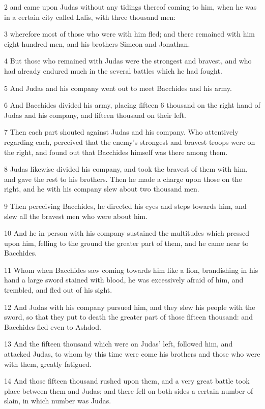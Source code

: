 2 and came upon Judas without any tidings thereof coming to him, when he was in a certain city called Lalis, with three thousand men: 

3 wherefore most of those who were with him fled; and there remained with him eight hundred men, and his brothers Simeon and Jonathan. 

4 But those who remained with Judas were the strongest and bravest, and who had already endured much in the several battles which he had fought. 

5 And Judas and his company went out to meet Bacchides and his army. 

6 And Bacchides divided his army, placing fifteen 6 thousand on the right hand of Judas and his company, and fifteen thousand on their left. 

7 Then each part shouted against Judas and his company. Who attentively regarding each, perceived that the enemy’s strongest and bravest troops were on the right, and found out that Bacchides himself was there among them. 

8 Judas likewise divided his company, and took the bravest of them with him, and gave the rest to his brothers. Then he made a charge upon those on the right, and he with his company slew about two thousand men. 

9 Then perceiving Bacchides, he directed his eyes and steps towards him, and slew all the bravest men who were about him. 

10 And he in person with his company sustained the multitudes which pressed upon him, felling to the ground the greater part of them, and he came near to Bacchides. 

11 Whom when Bacchides saw coming towards him like a lion, brandishing in his hand a large sword stained with blood, he was excessively afraid of him, and trembled, and fled out of his sight. 

12 And Judas with his company pursued him, and they slew his people with the sword, so that they put to death the greater part of those fifteen thousand: and Bacchides fled even to Ashdod. 

13 And the fifteen thousand which were on Judas’ left, followed him, and attacked Judas, to whom by this time were come his brothers and those who were with them, greatly fatigued. 

14 And those fifteen thousand rushed upon them, and a very great battle took place between them and Judas; and there fell on both sides a certain number of slain, in which number was Judas. 

